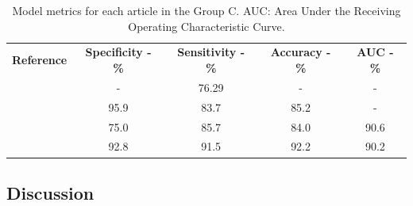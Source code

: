 \documentclass{article}
\begin{document}
\begin{table}[]
    \centering
    \begin{tabular}{ccccc}\toprule
        \multirow{2}{*}{\textbf{Reference}} & \multirow{2}{*}{\textbf{Specificity - \%}} & \multirow{2}{*}{\textbf{Sensitivity - \%}} & \multirow{2}{*}{\textbf{Accuracy - \%}} & \multirow{2}{*}{\textbf{AUC - \%}} \\
        \\\midrule
        \cite{Bi2017}                       & -                                          & 76.29                                      & -                                       & -                                  \\
        \cite{Bi2022}                       & 95.9                                       & 83.7                                       & 85.2                                    & -                                  \\
        \cite{Kong2022}                     & 75.0                                       & 85.7                                       & 84.0                                    & 90.6                               \\
        \cite{Zheng2020}                    & 92.8                                       & 91.5                                       & 92.2                                    & 90.2                               \\
        \bottomrule
    \end{tabular}
    \caption{Model metrics for each article in the Group C. AUC: Area Under the Receiving Operating Characteristic Curve.}
    \label{tab:res_C}
\end{table}

\subsection{Discussion}

\printbibliography
\end{document}
